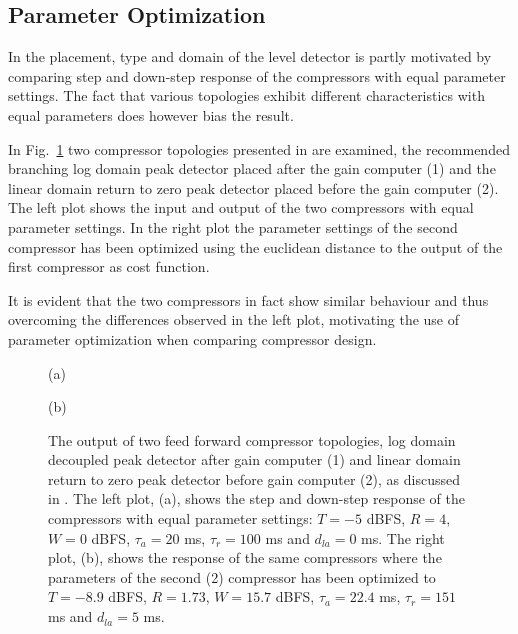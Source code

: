 \documentclass[../main2.tex]{subfiles}
\providecommand{\rootdir}{..}
\begin{document}
\subsection{Parameter Optimization}
In \cite{reiss2012tutorial} the placement, type and domain of the level detector is partly motivated by comparing step and down-step response of the compressors with equal parameter settings. The fact that various topologies exhibit different characteristics with equal parameters does however bias the result. 

In Fig.~\ref{fig:param_opt} two compressor topologies presented in \cite{reiss2012} are examined, the recommended branching log domain peak detector placed after the gain computer (1) and the linear domain return to zero peak detector placed before the gain computer (2). The left plot shows the input and output of the two compressors with equal parameter settings. In the right plot the parameter settings of the second compressor has been optimized using the euclidean distance to the output of the first compressor as cost function. 

It is evident that the two compressors in fact show similar behaviour and thus overcoming the differences observed in the left plot, motivating the use of parameter optimization when comparing compressor design.
\begin{figure}[ht]
\captionsetup*{justification=centering}
\begin{minipage}[t]{.5\textwidth}
 \centering

\caption*{(a)} 
\label{fig:comp_input}
\end{minipage}%
\begin{minipage}[t]{.5\textwidth}
\centering

\caption*{(b)} 
\end{minipage}
\caption{The output of two feed forward compressor topologies, log domain decoupled peak detector after gain computer (1) and linear domain return to zero peak detector before gain computer (2), as discussed in \cite{reiss2012tutorial}. The left plot, (a), shows the step and down-step response of the compressors with equal parameter settings: $T = -5$ dBFS, $R=4$, $W=0$ dBFS, $\tau_a = 20$ ms, $\tau_r = 100$ ms and $d_{la}=0$ ms. The right plot, (b), shows the response of the same compressors where the parameters of the second (2) compressor has been optimized to $T = -8.9$ dBFS, $R=1.73$, $W=15.7$ dBFS, $\tau_a = 22.4$ ms, $\tau_r = 151$ ms and $d_{la}=5$ ms.}
\label{fig:param_opt}
\end{figure}
\end{document}
